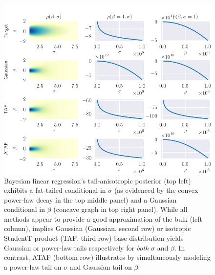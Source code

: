 \documentclass[twoside]{article}
\theoremstyle{definition}
\theoremstyle{remark}
\begin{document}

\begin{figure}[htbp]
  \centering
  \vspace{-0.5cm}
  \includegraphics{../Figures/blr_aniso.pdf}
  \vspace{-0.3cm}
  \caption{
    Bayesian linear regression's tail-anisotropic posterior
    (top left) exhibits a fat-tailed conditional in $\sigma$ (as evidenced by
    the convex power-law decay in the top middle panel) and a Gaussian conditional in $\beta$ (concave graph in top right panel).
    While all methods appear to provide a good approximation of the bulk (left column),
     implies
    Gaussian (Gaussian, second row) or isotropic StudentT product (TAF, third row) base distribution
    yields Gaussian or power-law tails respectively for \emph{both} $\sigma$ and $\beta$.
    In contrast, ATAF (bottom row) illustrates  by simultaneously
    modeling a power-law tail on $\sigma$ and Gaussian tail on $\beta$.
  }
  \label{fig:blr-anisotropic}
\end{figure}
\end{document}
